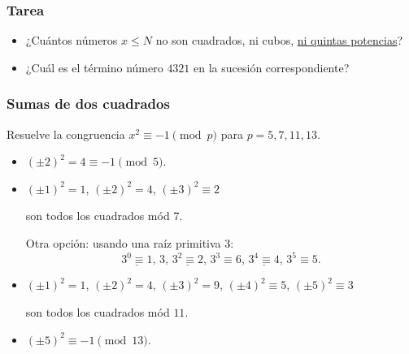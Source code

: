 \documentclass[handout]{beamer}
\begin{document}

\begin{frame}
  \frametitle{Tarea}

  \begin{shaded}
    \begin{itemize}
    \item ¿Cuántos números $x \le N$ no son cuadrados, ni cubos,
      \underline{ni quintas potencias}?

    \item ¿Cuál es el término número $4321$ en la sucesión correspondiente?
    \end{itemize}
  \end{shaded}
\end{frame}


\begin{frame}[fragile]
  \frametitle{Sumas de dos cuadrados}

  \begin{shaded}
    Resuelve la congruencia
    $x^2 \equiv -1 \pmod{p}$
    para $p = 5, 7, 11, 13$.
  \end{shaded}

  \ifdefined\solutions

  \begin{itemize}
  \item<3-> $(\pm 2)^2 = 4 \equiv -1 \pmod{5}$.

  \item<4-> $(\pm 1)^2 = 1$, $(\pm 2)^2 = 4$, $(\pm 3)^2 \equiv 2$

    son todos los cuadrados mód $7$.

    Otra opción: usando una raíz primitiva $3$:
    \[
      \underline{3^0 \equiv 1}, \,
      3, \,
      \underline{3^2 \equiv 2}, \,
      3^3 \equiv 6, \,
      \underline{3^4 \equiv 4}, \,
      3^5 \equiv 5.
    \]

  \item<5->
    $(\pm 1)^2 = 1$,
    $(\pm 2)^2 = 4$,
    $(\pm 3)^2 = 9$,
    $(\pm 4)^2 \equiv 5$,
    $(\pm 5)^2 \equiv 3$

    son todos los cuadrados mód $11$.


  \item<6-> $(\pm 5)^2 \equiv -1 \pmod{13}$.
  \end{itemize}
  \fi
\end{frame}
\end{document}
